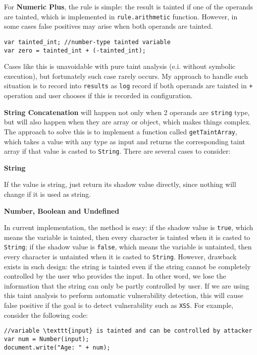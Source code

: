 For \textbf{Numeric Plus}, the rule is simple: the result is tainted if one of the operands are tainted, which is implemented in \texttt{rule.arithmetic} function. However, in some cases false positives may arise when both operands are tainted.

\begin{verbatim}
var tainted_int; //number-type tainted variable
var zero = tainted_int + (-tainted_int);
\end{verbatim}

Cases like this is unavoidable with pure taint analysis (e.i. without symbolic execution), but fortunately such case rarely occurs. My approach to handle such situation is to record into \texttt{results} as \texttt{log} record if both operands are tainted in \texttt{+} operation and user chooses if this is recorded in configuration.

\textbf{String Concatenation} will happen not only when 2 operands are \texttt{string} type, but will also happen when they are array or object, which makes things complex. The approach to solve this is to implement a function called \texttt{getTaintArray}, which takes a value with any type as input and returns the corresponding taint array if that value is casted to \texttt{String}. There are several cases to consider:

\textbf{String}

If the value is string, just return its shadow value directly, since nothing will change if it is used as string.

\textbf{Number, Boolean and Undefined}

In current implementation, the method is easy: if the shadow value is \texttt{true}, which means the variable is tainted, then every character is tainted when it is casted to \texttt{String}; if the shadow value is \texttt{false}, which means the variable is untainted, then every character is untainted when it is casted to \texttt{String}. However, drawback exists in such design: the string is tainted even if the string cannot be completely controlled by the user who provides the input. In other word, we lose the information that the string can only be partly controlled by user. If we are using this taint analysis to perform automatic vulnerability detection, this will cause false positive if the goal is to detect vulnerability such as \texttt{XSS}. For example, consider the following code:

\begin{verbatim}
//variable \texttt{input} is tainted and can be controlled by attacker
var num = Number(input); 
document.write("Age: " + num);
\end{verbatim}

